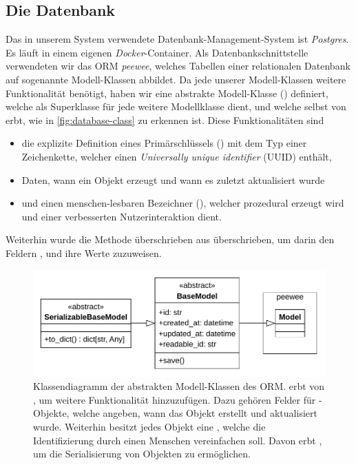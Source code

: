 \subsection{Die Datenbank}

Das in unserem System verwendete Datenbank-Management-System ist \emph{Postgres}. Es läuft in einem eigenen \emph{Docker}-Container. Als Datenbankschnittstelle verwendeten wir das ORM \emph{peewee}, welches Tabellen einer relationalen Datenbank auf sogenannte Modell-Klassen abbildet. Da jede unserer Modell-Klassen weitere Funktionalität benötigt, haben wir eine abstrakte Modell-Klasse () definiert, welche als Superklasse für jede weitere Modellklasse dient, und welche selbst von  erbt, wie in \autoref{fig:database-class} zu erkennen ist. Diese Funktionalitäten sind
\begin{itemize}
	\item die explizite Definition eines Primärschlüssels () mit dem Typ einer Zeichenkette, welcher einen \emph{Universally unique identifier} (UUID) enthält,
	\item Daten, wann ein Objekt erzeugt und wann es zuletzt aktualisiert wurde
	\item und einen menschen-lesbaren Bezeichner (), welcher prozedural erzeugt wird und einer verbesserten Nutzerinteraktion dient.
\end{itemize}
Weiterhin wurde die Methode  überschrieben aus  überschrieben, um darin den Feldern ,  und  ihre Werte zuzuweisen.

\begin{figure}[!ht]
	\centering
	\includegraphics[width=0.80\linewidth]{images/diagrams/database-class.pdf}
	\caption{Klassendiagramm der abstrakten Modell-Klassen des ORM.  erbt von , um weitere Funktionalität hinzuzufügen. Dazu gehören Felder für -Objekte, welche angeben, wann das Objekt erstellt und aktualisiert wurde. Weiterhin besitzt jedes Objekt eine , welche die Identifizierung durch einen Menschen vereinfachen soll. Davon erbt , um die Serialisierung von Objekten zu ermöglichen.}
	\label{fig:database-class}
\end{figure}

